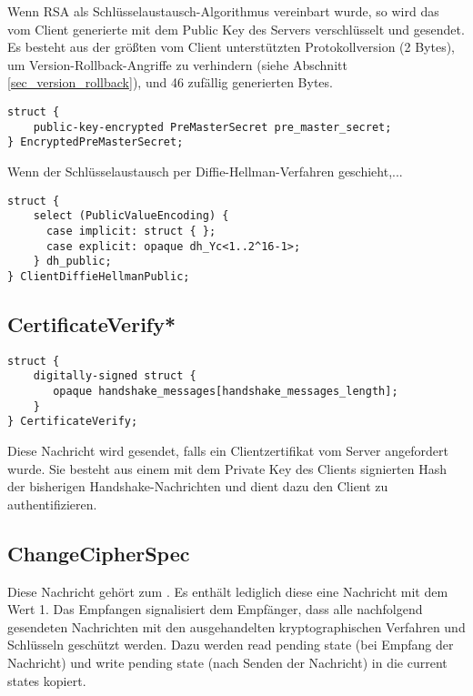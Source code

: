 Wenn RSA als Schlüsselaustausch-Algorithmus vereinbart wurde, so wird das vom Client generierte \premastersecret{} mit dem Public Key des Servers verschlüsselt und gesendet. Es besteht aus der größten vom Client unterstützten Protokollversion (2 Bytes), um Version-Rollback-Angriffe zu verhindern (siehe Abschnitt \ref{sec_version_rollback}), und 46 zufällig generierten Bytes.

\begin{lstlisting}
struct {
	public-key-encrypted PreMasterSecret pre_master_secret;
} EncryptedPreMasterSecret;
\end{lstlisting}

Wenn der Schlüsselaustausch per Diffie-Hellman-Verfahren geschieht,...

\begin{lstlisting}
struct {
	select (PublicValueEncoding) {
	  case implicit: struct { };
	  case explicit: opaque dh_Yc<1..2^16-1>;
	} dh_public;
} ClientDiffieHellmanPublic;
\end{lstlisting}

\subsection*{CertificateVerify*}

\begin{lstlisting}
struct {
	digitally-signed struct {
	   opaque handshake_messages[handshake_messages_length];
	}
} CertificateVerify;
\end{lstlisting}

Diese Nachricht wird gesendet, falls ein Clientzertifikat vom Server angefordert wurde. Sie besteht aus einem mit dem Private Key des Clients signierten Hash der bisherigen Handshake-Nachrichten und dient dazu den Client zu authentifizieren.

\subsection*{ChangeCipherSpec}

Diese Nachricht gehört zum \changecipherspecprotocol{}. Es enthält lediglich diese eine Nachricht mit dem Wert 1. Das Empfangen signalisiert dem Empfänger, dass alle nachfolgend gesendeten Nachrichten mit den ausgehandelten kryptographischen Verfahren und Schlüsseln geschützt werden. Dazu werden read pending state (bei Empfang der Nachricht) und write pending state (nach Senden der Nachricht) in die current states kopiert.

